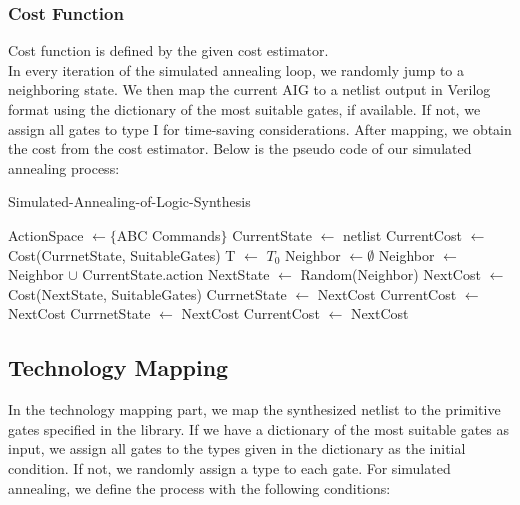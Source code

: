 \documentclass[conference]{IEEEtran}
\begin{document}
\subsubsection{Cost Function}

Cost function is defined by the given cost estimator.\\

In every iteration of the simulated annealing loop, we randomly jump to a neighboring state. We then map the current AIG to a netlist output in Verilog format using the dictionary of the most suitable gates, if available. If not, we assign all gates to type I for time-saving considerations. After mapping, we obtain the cost from the cost estimator. Below is the pseudo code of our simulated annealing process:

\begin{algorithm}
\begin{algorithmic}[1]
    \caption{Simulated-Annealing-of-Logic-Synthesis}\label{euclid}
    \State ActionSpace $ \gets \{ $ABC Commands$ \}$
    \State CurrentState $\gets$ netlist
    \State CurrentCost $\gets$ Cost(CurrnetState, SuitableGates)
    \State T $\gets$ $T_0$
        \State Neighbor $\gets \emptyset$
            \State Neighbor $\gets$ Neighbor $\cup$ CurrentState.action
        \EndFor
        \State NextState $\gets$ Random(Neighbor)
        \State NextCost $\gets$ Cost(NextState, SuitableGates)
            \State CurrnetState $\gets$ NextCost
            \State CurrentCost $\gets$ NextCost
            \State CurrnetState $\gets$ NextCost
            \State CurrentCost $\gets$ NextCost
        \EndIf
    \EndWhile
\end{algorithmic}
\end{algorithm}

\subsection{Technology Mapping}

In the technology mapping part, we map the synthesized netlist to the primitive gates specified in the library. If we have a dictionary of the most suitable gates as input, we assign all gates to the types given in the dictionary as the initial condition. If not, we randomly assign a type to each gate. For simulated annealing, we define the process with the following conditions:
\end{document}
